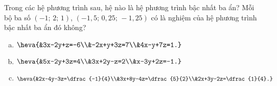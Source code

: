\begin{bt}
	Trong các hệ phương trình sau, hệ nào là hệ phương trình bậc nhất ba ẩn? Mỗi bộ ba số $(-1;\,2;\,1)$, $(-1,5;\,0,25;\,-1,25)$ có là nghiệm của hệ phương trình bậc nhất ba ẩn đó không?
	\begin{enumerate}[a)]
		\item $\heva{&3x-2y+z=-6\\&-2x+y+3z=7\\&4x-y+7z=1.}$
		\item $\heva{&5x-2y+3z=4\\&3x+2y-z=2\\&x-3y+2z=-1.}$
		\item $\heva{&2x-4y-3z=\dfrac{-1}{4}\\&3x+8y-4z=\dfrac{5}{2}\\&2x+3y-2z=\dfrac{1}{4}.}$
	\end{enumerate}
\end{bt}

